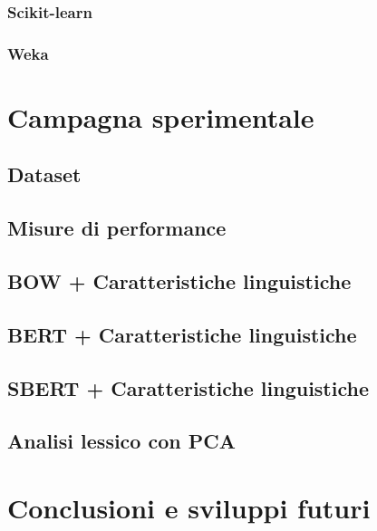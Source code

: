\documentclass[oneside]{book}
\begin{document}
\subsection{Scikit-learn}
\subsection{Weka}




\chapter{Campagna sperimentale}
\section{Dataset}
\section{Misure di performance}
\section{BOW + Caratteristiche linguistiche}
\section{BERT + Caratteristiche linguistiche}
\section{SBERT + Caratteristiche linguistiche}
\section{Analisi lessico con PCA}





\chapter{Conclusioni e sviluppi futuri}
\end{document}
